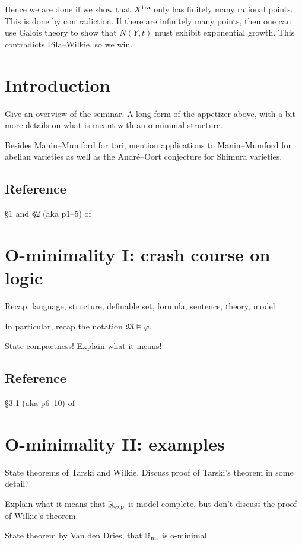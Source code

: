 \documentclass[10pt, a4paper]{amsart}
\def\phi{\varphi}
\begin{document}
Hence we are done if we show that $\tilde X^{\mathrm{tra}}$ only has finitely many rational points.
This is done by contradiction.
If there are infinitely many points,
then one can use Galois theory
to show that $N(Y, t)$ must exhibit exponential growth.
This contradicts Pila--Wilkie, so we win.

\section{Introduction}

Give an overview of the seminar.
A long form of the appetizer above,
with a bit more details on what is meant with an o-minimal structure.

Besides Manin--Mumford for tori,
mention applications to Manin--Mumford for abelian varieties
as well as the Andr\'e--Oort conjecture for Shimura varieties.

\subsection*{Reference} \S1 and \S2 (aka p1--5) of~\cite{scanlon}

\section{O-minimality I: crash course on logic}

Recap: language, structure, definable set, formula, sentence, theory, model.

In particular, recap the notation $\mathfrak M \models \phi$.

State compactness! Explain what it means!

\subsection*{Reference} \S3.1 (aka p6--10) of~\cite{scanlon}

\section{O-minimality II: examples}

State theorems of Tarski and Wilkie.
Discuss proof of Tarski's theorem in some detail?

Explain what it means that $\mathbb{R}_{\exp}$ is model complete,
but don't discuss the proof of Wilkie's theorem.

State theorem by Van den Dries, that $\mathbb{R}_{\mathrm{an}}$ is o-minimal.
\end{document}
